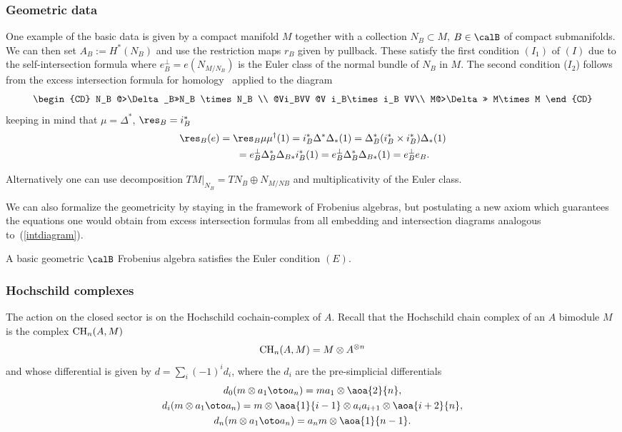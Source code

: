 \subsubsection{Geometric data}
\label{geodatasection} One example of the basic data is given by a
compact manifold $M$ together with a collection $N_B\subset M$, $B\in
\calB$ of compact submanifolds. We can then set $A_B:=H^*(N_B)$ and
use the restriction maps $r_B$     given by pullback. These satisfy
the f\/irst  condition $(I_1)$ of $(I)$ due to the self-intersection
formula where $e_B^{\perp}=e(N_{M/N_B})$ is the Euler class of the
normal bundle of $N_B$ in $M$. The second condition ($I_2$) follows
from the excess intersection formula for homology~\cite{Qu} applied
to the diagram
\begin{equation}
\label{intdiagram}
\begin{CD}
N_B @>\Delta_B>>N_B \times N_B \\
@Vi_BVV @V i_B\times i_B VV\\
M@>\Delta>> M\times M
\end{CD}
\end{equation}
keeping in mind that $\mu=\Delta^{*}$, $\res_B=i_B^*$
\begin{gather*}
\res_B(e)=\res_B\mu\mu^{\dagger}(1)=i_B^*\Delta^*\Delta_*(1)=\Delta^*_B(i_{B}^*\times i_{B}^*)\Delta_*(1) \\
\phantom{\res_B(e)}{} =e_B^{\perp}\Delta_B^*\Delta_{B*}i_B^*(1)=e_B^{\perp}\Delta_B^*\Delta_{B*}(1)=
e^{\perp}_Be_B.
\end{gather*}

Alternatively one can use decomposition $TM|_{N_B}=TN_B\oplus N_{M/NB}$ and multiplicativity of the Euler class.

\begin{rmk}
We can also formalize the geometricity by  staying in the framework of Frobenius algebras, but
postulating a new axiom which guarantees the equations one would obtain from excess intersection formulas from all embedding and intersection diagrams analogous to~(\ref{intdiagram}).
\end{rmk}

\begin{cor}
A basic geometric $\calB$ Frobenius algebra satisfies the Euler condition $(E)$.
\end{cor}

\subsubsection{Hochschild complexes}
The action on the closed sector is on the Hochschild cochain-complex of $A$.
Recall that the Hochschild chain complex of an $A$ bimodule $M$ is the complex ${\rm CH}_n(A,M)$
\[
{\rm CH}_n(A,M)=M\otimes A^{\otimes n}
\]
and whose  dif\/ferential is given by $d=\sum_i (-1)^i d_i$,
where the $d_i$ are the pre-simplicial dif\/ferentials
\begin{gather*}
d_0 (m\otimes a_1 \oto a_n ) = m a_1 \otimes\aoa{2}{n},\\
d_i (m\otimes a_1 \oto a_n) = m\otimes \aoa{1}{i-1}\otimes a_{i}a_{i+1}\otimes
\aoa{i+2}{n}, \\
d_{n} ( m\otimes a_1 \oto a_n ) = a_n m\otimes\aoa{1}{n-1}.
\end{gather*}



